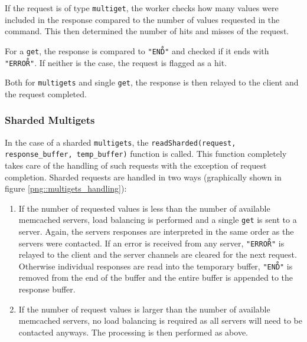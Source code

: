 \documentclass[11pt,a4paper]{article}
\begin{document}
If the request is of type \texttt{multiget}, the worker checks how many values were included in the response compared to the number of values requested in the command. This then determined the number of hits and misses of the request.

For a \texttt{get}, the response is compared to \texttt{"END\r\n"} and checked if it ends with \texttt{"ERROR\r\n"}. If neither is the case, the request is flagged as a hit.

Both for \texttt{multigets} and single \texttt{get}, the response is then relayed to the client and the request completed.


\subsubsection{Sharded Multigets}
In the case of a sharded \texttt{multigets}, the \texttt{readSharded(request, response_buffer, temp_buffer)} function is called. This function completely takes care of the handling of such requests with the exception of request completion. Sharded requests are handled in two ways (graphically shown in figure \ref{png::multigets_handling}):
\begin{enumerate}
    \item If the number of requested values is less than the number of available memcached servers, load balancing is performed and a single \texttt{get} is sent to a server. Again, the servers responses are interpreted in the same order as the servers were contacted. If an error is received from any server, \texttt{"ERROR\r\n"} is relayed to the client and the server channels are cleared for the next request. Otherwise individual responses are read into the temporary buffer, \texttt{"END\r\n"} is removed from the end of the buffer and the entire buffer is appended to the response buffer.
    \item If the number of request values is larger than the number of available memcached servers, no load balancing is required as all servers will need to be contacted anyways. The processing is then performed as above.
\end{enumerate}
\end{document}
